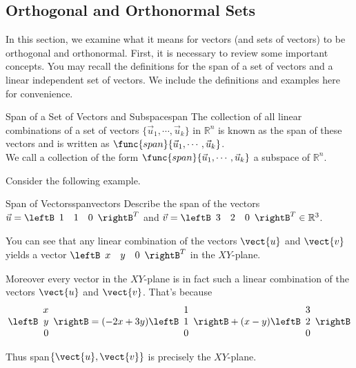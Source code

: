 \subsection{Orthogonal and Orthonormal Sets}

In this section, we examine what it means for vectors (and sets of
vectors) to be orthogonal and orthonormal. First, it is necessary to
review some important concepts. You may recall the definitions for the
span of a set of vectors and a linear independent set of vectors. We
include the definitions and examples here for convenience.

\begin{definition}{Span of a Set of Vectors and Subspace}{span}
The collection of all linear combinations of a set of vectors $\{ \vec{u}_1,
\cdots ,\vec{u}_k\}$ in $\mathbb{R}^{n}$ is known as the span of these
vectors and is written as $\func{span} \{\vec{u}_1, \cdots ,
\vec{u}_k\}$. \\ 
We call a collection of the form $\func{span} \{\vec{u}_1, \cdots , \vec{u}_k\}$ 
a subspace of $\mathbb{R}^{n}$.
 
\end{definition}

Consider the following example. 

\begin{example}{Span of Vectors}{spanvectors}
Describe the span of the vectors $\vec{u}=\leftB 
\begin{array}{rrr}
1  & 1 & 0
\end{array}
\rightB^T$ and
$\vec{v}=\leftB 
\begin{array}{rrr}
3  & 2 & 0
\end{array}
\rightB^T \in \mathbb{R}^{3}$.
\end{example}

\begin{solution}
You can see that any linear combination of the vectors $\vect{u}$ and $\vect{v}$ yields a vector 
$\leftB 
\begin{array}{rrr}
x  & y & 0
\end{array}
\rightB^T$ in the $XY$-plane. 

Moreover every vector in the $XY$-plane is in fact such a linear
combination of the vectors $\vect{u}$ and $\vect{v}$. That's because
\[ \leftB 
\begin{array}{r}
x \\
y \\
0
\end{array}
\rightB 
=
(-2x+3y) \leftB 
\begin{array}{r}
1 \\
1 \\
0
\end{array}
\rightB
+
(x-y)\leftB 
\begin{array}{r}
3 \\
2 \\
0
\end{array}
\rightB 
\]

Thus  span$\{\vect{u},\vect{v}\}$ is precisely the $XY$-plane.
\end{solution}

